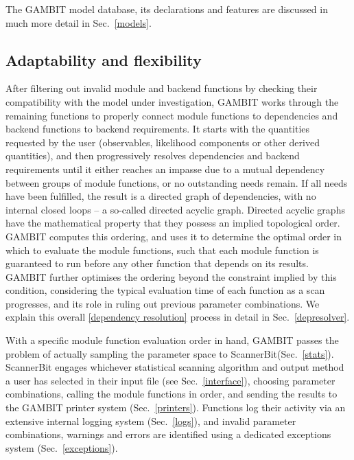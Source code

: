 \documentclass[pdftex,twocolumn,epjc3_preprint,runningheads]{svjour3}
\renewcommand{\_}{\discretionary{\underscore}{}{\underscore}}
\newcommand{\cross}[1]{\ref{#1}}
\newcommand{\gambit}{\textsf{GAMBIT}\xspace}
\newcommand{\scannerbit}{\textsf{ScannerBit}\xspace}
\newcommand{\GB}{\gambit}
\begin{document}
The \GB model database, its declarations and features are discussed in much more detail in Sec.\ \ref{models}.

\subsection{Adaptability and flexibility}

After filtering out invalid module and backend functions by checking their compatibility with the model under investigation, \GB works through the remaining functions to properly connect module functions to dependencies and backend functions to backend requirements.  It starts with the quantities requested by the user (observables, likelihood components or other derived quantities), and then progressively resolves dependencies and backend requirements until it either reaches an impasse due to a mutual dependency between groups of module functions, or no outstanding needs remain.  If all needs have been fulfilled, the result is a directed graph of dependencies, with no internal closed loops -- a so-called directed acyclic graph.  Directed acyclic graphs have the mathematical property that they possess an implied topological order.  \GB computes this ordering, and uses it to determine the optimal order in which to evaluate the module functions, such that each module function is guaranteed to run before any other function that depends on its results.  \GB further optimises the ordering beyond the constraint implied by this condition, considering the typical evaluation time of each function as a scan progresses, and its role in ruling out previous parameter combinations.  We explain this overall \cross{dependency resolution} process in detail in Sec.\ \ref{depresolver}.

With a specific module function evaluation order in hand, \GB passes the problem of actually sampling the parameter space to \scannerbit (Sec.\ \ref{stats}).  \scannerbit engages whichever statistical scanning algorithm and output method a user has selected in their input file (see Sec.\ \ref{interface}), choosing parameter combinations, calling the module functions in order, and sending the results to the \GB printer system (Sec.\ \ref{printers}).  Functions log their activity via an extensive internal logging system (Sec.\ \ref{logs}), and invalid parameter combinations, warnings and errors are identified using a dedicated exceptions system (Sec.\ \ref{exceptions}).
\end{document}
